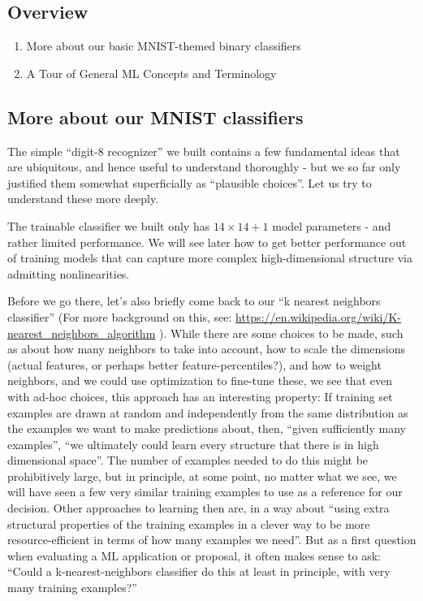 \documentclass[11pt]{article}
\providecommand{\tightlist}{%
      \setlength{\itemsep}{0pt}\setlength{\parskip}{0pt}}
\begin{document}
\hypertarget{overview}{%
\subsection{Overview}\label{overview}}

\begin{enumerate}
\def\labelenumi{\arabic{enumi}.}
\tightlist
\item
  More about our basic MNIST-themed binary classifiers
\item
  A Tour of General ML Concepts and Terminology
\end{enumerate}

\hypertarget{more-about-our-mnist-classifiers}{%
\subsection{More about our MNIST
classifiers}\label{more-about-our-mnist-classifiers}}

The simple ``digit-8 recognizer'' we built contains a few fundamental
ideas that are ubiquitous, and hence useful to understand thoroughly -
but we so far only justified them somewhat superficially as ``plausible
choices''. Let us try to understand these more deeply.

The trainable classifier we built only has \(14\times 14+1\) model
parameters - and rather limited performance. We will see later how to
get better performance out of training models that can capture more
complex high-dimensional structure via admitting nonlinearities.

Before we go there, let's also briefly come back to our ``k nearest
neighbors classifier'' (For more background on this, see:
\url{https://en.wikipedia.org/wiki/K-nearest_neighbors_algorithm} ).
While there are some choices to be made, such as about how many
neighbors to take into account, how to scale the dimensions (actual
features, or perhaps better feature-percentiles?), and how to weight
neighbors, and we could use optimization to fine-tune these, we see that
even with ad-hoc choices, this approach has an interesting property: If
training set examples are drawn at random and independently from the
same distribution as the examples we want to make predictions about,
then, ``given sufficiently many examples'', ``we ultimately could learn
every structure that there is in high dimensional space''. The number of
examples needed to do this might be prohibitively large, but in
principle, at some point, no matter what we see, we will have seen a few
very similar training examples to use as a reference for our decision.
Other approaches to learning then are, in a way about ``using extra
structural properties of the training examples in a clever way to be
more resource-efficient in terms of how many examples we need''. But as
a first question when evaluating a ML application or proposal, it often
makes sense to ask: ``Could a k-nearest-neighbors classifier do this at
least in principle, with very many training examples?''
\end{document}
